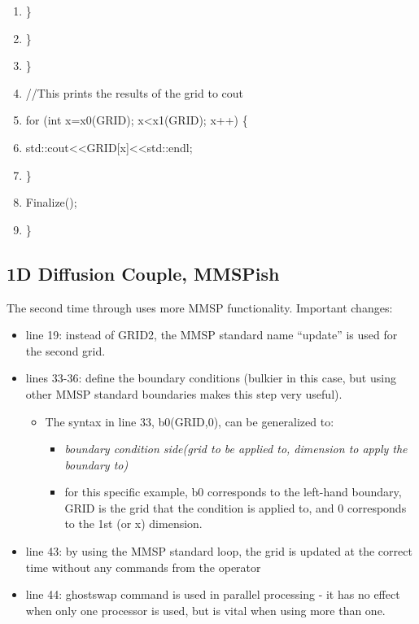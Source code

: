 \documentclass{article}
\begin{document}
\begin{shadebox}
\begin{enumerate}
\item \hspace{10pt} \hspace{10pt}                 \}
\item \hspace{10pt}         \}
\item \}
\item //This prints the results of the grid to cout
\item for (int x=x0(GRID); x\textless x1(GRID); x++) \{
\item \hspace{10pt}         std::cout\textless \textless GRID[x]\textless \textless std::endl;
\item \}
\item Finalize();
\item \}
\end{enumerate}

\end{shadebox}

\subsection{1D Diffusion Couple, MMSPish}
The second time through uses more MMSP functionality. Important changes:

\begin{itemize} \itemsep1pt \parskip0pt 
\item line 19: instead of GRID2, the MMSP standard name “update” is used for the second grid.
\item lines 33-36: define the boundary conditions (bulkier in this case, but using other MMSP standard boundaries makes this step very useful).
\begin{itemize} \itemsep1pt \parskip0pt 
\item The syntax in line 33, b0(GRID,0), can be generalized to:
\begin{itemize} \itemsep1pt \parskip0pt 
\item \textit{boundary condition side(grid to be applied to, dimension to apply the boundary to)}
\item for this specific example, b0 corresponds to the left-hand boundary, GRID is the grid that the condition is applied to, and 0 corresponds to the 1st (or x) dimension.
\end {itemize}
\end {itemize}
\item line 43: by using the MMSP standard loop, the grid is updated at the correct time without any commands from the operator
\item line 44: ghostswap command is used in parallel processing - it has no effect when only one processor is used, but is vital when using more than one.
\end {itemize}
\end{document}

